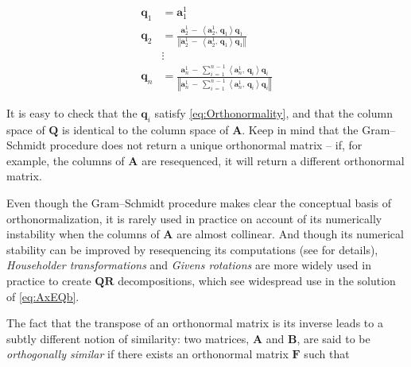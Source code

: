 \documentclass[graybox,envcountchap,sectrefs]{svmono}\usepackage[]{graphicx}\usepackage[]{xcolor}
\begin{document}
\begin{appendices}
\begin{equation}
\begin{array}{cl}
\mathrm{\mathbf{q}}_{1} & =\mathrm{\mathbf{a}}_{1}^{1}\\
\mathrm{\mathbf{q}}_{2} & =\frac{\mathbf{\mathrm{\mathbf{a}}}_{2}^{1}\,-\,\left\langle \mathbf{\mathrm{\mathbf{a}}}_{2}^{1},\,\mathrm{\mathbf{q}}_{1}\right\rangle \mathrm{\mathbf{q}}_{1}}{\left\Vert \mathbf{\mathrm{\mathbf{a}}}_{2}^{1}\,-\,\left\langle \mathbf{\mathrm{\mathbf{a}}}_{2}^{1},\,\mathrm{\mathbf{q}}_{1}\right\rangle \mathrm{\mathbf{q}}_{1}\right\Vert }\\
 & \vdots\\
\mathrm{\mathbf{q}}_{n} & =\frac{\mathbf{\mathrm{\mathbf{a}}}_{n}^{1}\,-\,\sum_{i\,=\,1}^{n\,-\,1}\left\langle \mathbf{\mathrm{\mathbf{a}}}_{n}^{1},\,\mathrm{\mathbf{q}}_{i}\right\rangle \mathrm{\mathbf{q}}_{i}}{\left\Vert \mathbf{\mathrm{\mathbf{a}}}_{n}^{1}\,-\,\sum_{i\,=\,1}^{n\,-\,1}\left\langle \mathbf{\mathrm{\mathbf{a}}}_{n}^{1},\,\mathrm{\mathbf{q}}_{i}\right\rangle \mathrm{\mathbf{q}}_{i}\right\Vert }
\end{array}\label{eq:GramSchmidt}
\end{equation}

It is easy to check that the $\mathrm{\mathbf{q}}_{i}$ satisfy \eqref{eq:Orthonormality},
and that the column space of $\mathrm{\mathbf{Q}}$ is identical to
the column space of $\mathrm{\mathbf{A}}$. Keep in mind that the
Gram--Schmidt procedure does not return a unique orthonormal matrix
-- if, for example, the columns of $\mathrm{\mathbf{A}}$ are resequenced,
it will return a different orthonormal matrix.

Even though the Gram--Schmidt procedure makes clear the conceptual
basis of orthonormalization, it is rarely used in practice on account
of its numerically instability when the columns of $\mathrm{\mathbf{A}}$
are almost collinear. And though its numerical stability can be improved
by resequencing its computations (see \citet{Gentle2017} for details),
\emph{Householder transformations} and \emph{Givens rotations} are
more widely used in practice to create $\mathrm{\mathbf{Q}}\mathbf{R}$
decompositions, which see widespread use in the solution of \eqref{eq:AxEQb}. 

The fact that the transpose of an orthonormal matrix is its inverse
leads to a subtly different notion of similarity: two matrices, $\mathrm{\mathbf{A}}$
and $\mathrm{\mathbf{B}}$, are said to be \emph{orthogonally similar}
if there exists an orthonormal matrix $\mathrm{\mathbf{F}}$ such
that 


\end{appendices}
\end{document}
